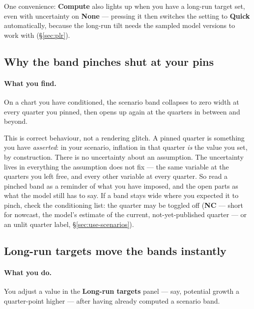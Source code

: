 \documentclass[11pt]{article}
\theoremstyle{definition}
\theoremstyle{remark}
\begin{document}
One convenience: \textbf{Compute} also lights up when you have a long-run target set,
even with uncertainty on \textbf{None} --- pressing it then switches the setting to
\textbf{Quick} automatically, because the long-run tilt needs the sampled model
versions to work with (\S\ref{sec:plr}).

\subsection{Why the band pinches shut at your pins}

\paragraph{What you find.} On a chart you have conditioned, the scenario band collapses
to zero width at every quarter you pinned, then opens up again at the quarters in
between and beyond.

This is correct behaviour, not a rendering glitch. A pinned quarter is something you
have \emph{asserted}: in your scenario, inflation in that quarter \emph{is} the value
you set, by construction. There is no uncertainty about an assumption. The uncertainty
lives in everything the assumption does not fix --- the same variable at the quarters
you left free, and every other variable at every quarter. So read a pinched band as a
reminder of what you have imposed, and the open parts as what the model still has to
say. If a band stays wide where you expected it to pinch, check the conditioning list:
the quarter may be toggled off (\textbf{NC} --- short for nowcast, the model's estimate
of the current, not-yet-published quarter --- or an unlit quarter label,
\S\ref{sec:use-scenarios}).

\subsection{Long-run targets move the bands instantly}

\paragraph{What you do.} You adjust a value in the \textbf{Long-run targets} panel ---
say, potential growth a quarter-point higher --- after having already computed a
scenario band.
\end{document}
